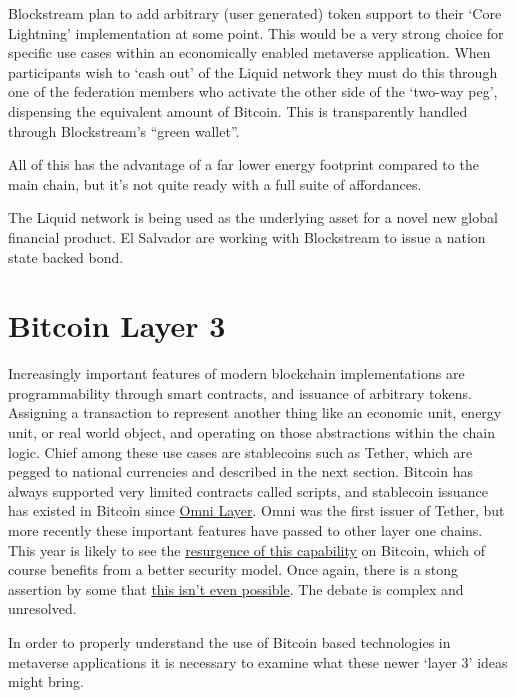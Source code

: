 Blockstream plan to add arbitrary (user generated) token support to their `Core Lightning' implementation at some point. This would be a very strong choice for specific use cases within an economically enabled metaverse application. When participants wish to `cash out' of the Liquid network they must do this through one of the federation members who activate the other side of the `two-way peg', dispensing the equivalent amount of Bitcoin. This is transparently handled through Blockstream's ``green wallet''.\par
All of this has the advantage of a far lower energy footprint compared to the main chain, but it's not quite ready with a full suite of affordances. \par
The Liquid network is being used as the underlying asset for a novel new global financial product. El Salvador are working with Blockstream to issue a nation state backed bond. 
\section{Bitcoin Layer 3}
Increasingly important features of modern blockchain implementations are programmability through smart contracts, and issuance of arbitrary tokens. Assigning a transaction to represent another thing like an economic unit, energy unit, or real world object, and operating on those abstractions within the chain logic. Chief among these use cases are stablecoins such as Tether, which are pegged to national currencies and described in the next section. Bitcoin has always supported very limited contracts called scripts, and stablecoin issuance has existed in Bitcoin since 
\href{https://www.omnilayer.org/}{Omni Layer}. Omni was the first issuer of Tether, but more recently these important features have passed to other layer one chains. This year is likely to see the \href{https://www.hiro.so/blog/bitcoin-ecosystem-a-guide-to-programming-languages-for-bitcoin-smart-contracts}{resurgence of this capability} on Bitcoin, which of course benefits from a better security model. Once again, there is a stong assertion by some that \href{https://lists.linuxfoundation.org/pipermail/bitcoin-dev/2022-April/020227.html}{this isn't even possible}. The debate is complex and unresolved.\par 
In order to properly understand the use of Bitcoin based technologies in metaverse applications it is necessary to examine what these newer `layer 3' ideas might bring. 
